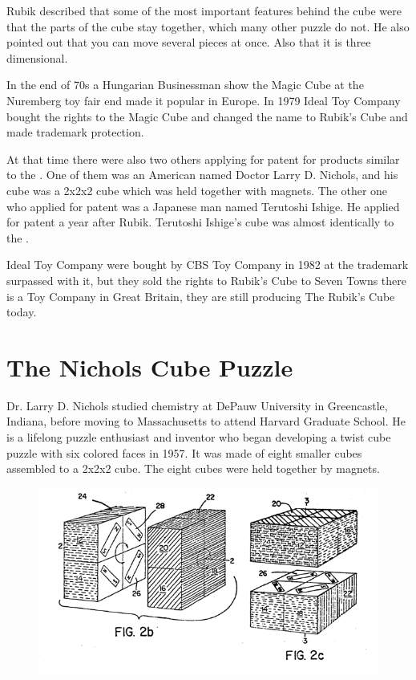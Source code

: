 Rubik described that some of the most important features behind the cube were that the parts of the cube stay together, which many other puzzle do not. He also pointed out that you can move several pieces at once. Also that it is three dimensional. 

In the end of 70s a Hungarian Businessman show the Magic Cube at the Nuremberg toy fair end made it popular in Europe. In 1979 Ideal Toy Company bought the rights to the Magic Cube and changed the name to Rubik's Cube and made trademark protection. 

At that time there were also two others applying for patent for products similar to the \rubik{}.  One of them was an American named Doctor Larry D. Nichols, and his cube was a 2x2x2 cube which was held together with magnets. The other one who applied for patent was a Japanese man named Terutoshi Ishige. He applied for patent a year after Rubik. Terutoshi Ishige's cube was almost identically to the \rubik{}.

Ideal Toy Company were bought by CBS Toy Company in 1982 at the trademark surpassed with it, but they sold the rights to Rubik's Cube to Seven Towns there is a Toy Company in Great Britain, they are still producing  The Rubik's Cube today.


 
\section{The Nichols Cube Puzzle}
Dr. Larry D. Nichols studied chemistry at DePauw University in Greencastle, Indiana, before moving to Massachusetts to attend Harvard Graduate School. 
He is a lifelong puzzle enthusiast and inventor who  began developing a twist cube puzzle with six colored faces in 1957. It was made of eight smaller cubes assembled to a 2x2x2 cube. The eight cubes were held together by magnets.

\begin{figure}[H]
\begin{center}
\includegraphics[scale=0.8]{input/pics/Nicholspatent2.png}
\caption{}
\label{fig:Nicholspatent}
\end{center}
\end{figure}

